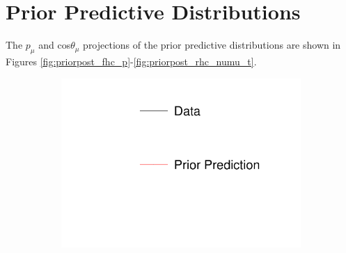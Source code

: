 \chapter{Prior Predictive Distributions}\label{app:priorpred}

The $p_{\mu}$ and cos$\theta_{\mu}$ projections of the prior predictive distributions are shown in Figures \ref{fig:priorpost_fhc_p}-\ref{fig:priorpost_rhc_numu_t}.

\begin{figure}[!h]
\centering
\begin{subfigure}{.24\textwidth}
  \centering
  \includegraphics[width=\linewidth, clip]{figs/prioronly1dleg.pdf}
\end{subfigure}


\end{figure}
